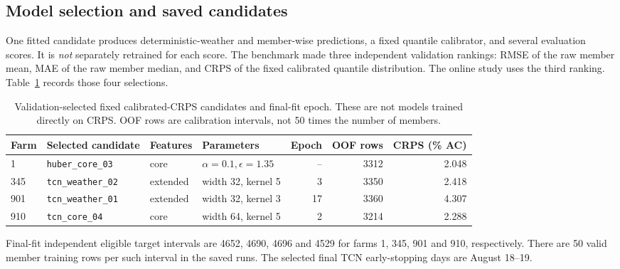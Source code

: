 \documentclass[11pt,a4paper]{article}
\newcommand{\code}[1]{\nolinkurl{#1}}
\begin{document}
\subsection{Model selection and saved candidates}\label{sec:selected}
One fitted candidate produces deterministic-weather and member-wise predictions, a fixed quantile calibrator, and several evaluation scores. It is \emph{not} separately retrained for each score. The benchmark made three independent validation rankings: RMSE of the raw member mean, MAE of the raw member median, and CRPS of the fixed calibrated quantile distribution. The online study uses the third ranking. Table~\ref{tab:selected} records those four selections.
\begin{table}[H]\centering\small
\begin{tabular}{llllrrr}\toprule
Farm & Selected candidate & Features & Parameters & Epoch & OOF rows & CRPS (\% AC)\\\midrule
1 & \code{huber_core_03} & core & $\alpha=0.1,\epsilon=1.35$ & -- & 3312 & 2.048\\
345 & \code{tcn_weather_02} & extended & width 32, kernel 5 & 3 & 3350 & 2.418\\
901 & \code{tcn_weather_01} & extended & width 32, kernel 3 & 17 & 3360 & 4.307\\
910 & \code{tcn_core_04} & core & width 64, kernel 5 & 2 & 3214 & 2.288\\
\bottomrule\end{tabular}\caption{Validation-selected fixed calibrated-CRPS candidates and final-fit epoch. These are not models trained directly on CRPS. OOF rows are calibration intervals, not 50 times the number of members.}\label{tab:selected}\end{table}
Final-fit independent eligible target intervals are 4652, 4690, 4696 and 4529 for farms 1, 345, 901 and 910, respectively. There are 50 valid member training rows per such interval in the saved runs. The selected final TCN early-stopping days are August 18--19.
\end{document}
